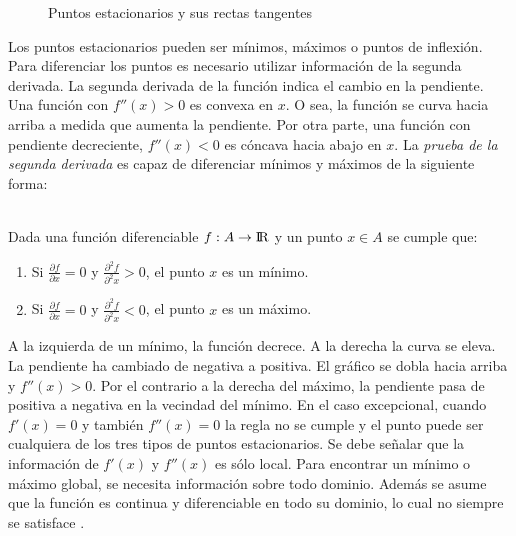 \begin{figure}
\centering
\caption{Puntos estacionarios y sus rectas tangentes}
\end{figure}

Los puntos estacionarios pueden ser mínimos, máximos o puntos de inflexión. Para diferenciar los puntos es necesario utilizar información de la segunda derivada.  La segunda derivada de la función indica el cambio en la pendiente. Una función con $f''(x)> 0$ es convexa en $x$. O sea, la función se curva hacia arriba a medida que aumenta la pendiente. Por otra parte, una función con pendiente decreciente, $f'' (x) <0$ es cóncava hacia abajo en $x$. La \textit{prueba de la segunda derivada} es capaz de diferenciar mínimos y máximos de la siguiente forma:
\\
\\
\begin{defn}
Dada una función diferenciable $f:A \to {\rm I\!R}$  y un punto $x \in A$ se cumple que:
\begin{enumerate}
\item Si $ \frac{\partial f}{\partial x} =0$ y $\frac{\partial^2 f}{\partial^2 x} >0$, el punto $x$ es un mínimo.
\item Si $ \frac{\partial f}{\partial x} =0$ y  $\frac{\partial^2 f}{\partial^2 x} <0$, el punto $x$ es un máximo.
\end{enumerate}
\end{defn}

A la izquierda de un mínimo, la función decrece. A la derecha la curva se eleva. La pendiente ha cambiado de negativa a positiva. El gráfico se dobla hacia arriba y $f''(x)> 0$. Por el contrario a la derecha del máximo, la pendiente pasa de positiva a negativa en la vecindad del mínimo. En el caso excepcional,
cuando $f'(x) = 0$ y también $f''(x) = 0$ la regla no se cumple y el punto puede ser cualquiera de los tres tipos de puntos estacionarios. Se debe señalar que la información de $f'(x)$ y $f''(x)$ es sólo  local. Para encontrar un mínimo o máximo global, se necesita información sobre todo dominio. Además se asume que la función es continua y diferenciable en todo su dominio, lo cual no siempre se satisface \cite{gilbert_calculus_2010}.
